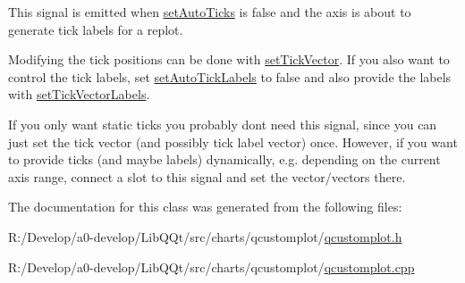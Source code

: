 This signal is emitted when \mbox{\hyperlink{class_q_c_p_axis_ae867c23d3a6a7bd4d09cc66c5d018f63}{set\+Auto\+Ticks}} is false and the axis is about to generate tick labels for a replot.

Modifying the tick positions can be done with \mbox{\hyperlink{class_q_c_p_axis_a871db94c5d796c80fcbe1a9d4506e27e}{set\+Tick\+Vector}}. If you also want to control the tick labels, set \mbox{\hyperlink{class_q_c_p_axis_aaa47e3a6bac0c20d4beb9028f01bc1a1}{set\+Auto\+Tick\+Labels}} to false and also provide the labels with \mbox{\hyperlink{class_q_c_p_axis_a921d3ba3853ca3bd2cce3459f7a243ed}{set\+Tick\+Vector\+Labels}}.

If you only want static ticks you probably don\textquotesingle{}t need this signal, since you can just set the tick vector (and possibly tick label vector) once. However, if you want to provide ticks (and maybe labels) dynamically, e.\+g. depending on the current axis range, connect a slot to this signal and set the vector/vectors there. 

The documentation for this class was generated from the following files\+:\begin{DoxyCompactItemize}
\item 
R\+:/\+Develop/a0-\/develop/\+Lib\+Q\+Qt/src/charts/qcustomplot/\mbox{\hyperlink{qcustomplot_8h}{qcustomplot.\+h}}\item 
R\+:/\+Develop/a0-\/develop/\+Lib\+Q\+Qt/src/charts/qcustomplot/\mbox{\hyperlink{qcustomplot_8cpp}{qcustomplot.\+cpp}}\end{DoxyCompactItemize}
